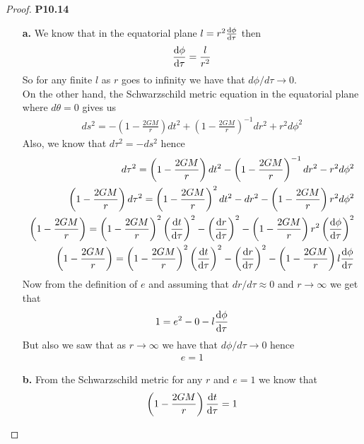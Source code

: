 \documentclass[11pt]{article}
\theoremstyle{definition}
\begin{document}
\begin{proof}{\textbf{P10.14}}
\begin{itemize}
    \item [\textbf{a.}] We know that in the equatorial plane
    $l = r^2 \dv{\phi}{\tau}$ then
    \begin{align*}
        \dv{\phi}{\tau} = \frac{l}{r^2}
    \end{align*}
    So for any finite $l$ as $r$ goes to infinity we have that
    $d\phi/d\tau \to 0$.\\    
    On the other hand, the Schwarzschild metric equation in the equatorial plane
    where $d\theta = 0$ gives us 
    \begin{align*}
        ds^2 = -\left(1 - \frac{2GM}{r}\right)dt^2
        + \left(1 - \frac{2GM}{r}\right)^{-1}dr^2 + r^2d\phi^2
    \end{align*}
    Also, we know that $d\tau^2 = -ds^2$ hence
    \begin{align*}
        d\tau^2 = \left(1 - \frac{2GM}{r}\right)dt^2
        - \left(1 - \frac{2GM}{r}\right)^{-1}dr^2 - r^2d\phi^2\\
        \left(1 - \frac{2GM}{r}\right)d\tau^2 = \left(1 - \frac{2GM}{r}\right)^2dt^2
        - dr^2 - \left(1 - \frac{2GM}{r}\right)r^2d\phi^2\\
        \left(1 - \frac{2GM}{r}\right)
        = \left(1 - \frac{2GM}{r}\right)^2\left(\dv{t}{\tau}\right)^2
        - \left(\dv{r}{\tau}\right)^2
        - \left(1 - \frac{2GM}{r}\right)r^2\left(\dv{\phi}{\tau}\right)^2\\
        \left(1 - \frac{2GM}{r}\right)
        = \left(1 - \frac{2GM}{r}\right)^2\left(\dv{t}{\tau}\right)^2
        - \left(\dv{r}{\tau}\right)^2
        - \left(1 - \frac{2GM}{r}\right)l\dv{\phi}{\tau}
    \end{align*}
    Now from the definition of $e$ and assuming that $dr/d\tau \approx 0$
    and $r \to \infty$ we get that
    \begin{align*}
        1 = e^2 - 0 - l\dv{\phi}{\tau}
    \end{align*}
    But also we saw that as $r \to \infty$ we have that $d\phi/d\tau \to 0$ hence
    \begin{align*}
        e = 1
    \end{align*}
    \item [\textbf{b.}] From the Schwarzschild metric for any $r$ and $e = 1$
    we know that 
    \begin{align*}
        \left(1 - \frac{2GM}{r}\right)\dv{t}{\tau} = 1
    \end{align*}

\end{itemize}
\end{proof}
\end{document}
